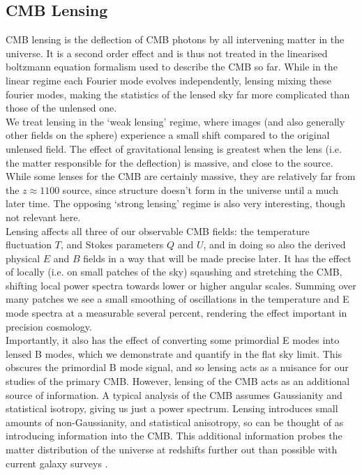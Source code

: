 \documentclass[a4paper,10pt]{article}
\begin{document}
\subsection{CMB Lensing}
CMB lensing is the deflection of CMB photons by all intervening matter in the universe. It is a second order effect and is thus not treated in the linearised boltzmann equation formalism used to describe the CMB so far. While in the linear regime each Fourier mode evolves independently, lensing mixing these fourier modes, making the statistics of the lensed sky far more complicated than those of the unlensed one. \\

We treat lensing in the `weak lensing' regime, where images (and also generally other fields on the sphere) experience a small shift compared to the original unlensed field. The effect of gravitational lensing is greatest when the lens (i.e. the matter responsible for the deflection) is massive, and close to the source. While some lenses for the CMB are certainly massive, they are relatively far from the $z\approx1100$ source, since structure doesn't form in the universe until a much later time. The opposing `strong lensing' regime is also very interesting, though not relevant here.\\

Lensing affects all three of our observable CMB fields: the temperature fluctuation $T$, and Stokes parameters $Q$ and $U$, and in doing so also the derived physical $E$ and $B$ fields in a way that will be made precise later. It has the effect of locally (i.e. on small patches of the sky) sqaushing and stretching the CMB, shifting local power spectra towards lower or higher angular scales. Summing over many patches we see a small smoothing of oscillations in the temperature and E mode spectra at a measurable several percent, rendering the effect important in precision cosmology. \\

Importantly, it also has the effect of converting some primordial E modes into lensed B modes, which we demonstrate and quantify in the flat sky limit. This obscures the primordial B mode signal, and so lensing acts as a nuisance for our studies of the primary CMB. However, lensing of the CMB acts as an additional source of information. A typical analysis of the CMB assumes Gaussianity and statistical isotropy, giving us just a power spectrum. Lensing introduces small amounts of non-Gaussianity, and statistical anisotropy, so can be thought of as introducing information into the CMB. This additional information probes the matter distribution of the universe at redshifts further out than possible with current galaxy surveys \cite{sloan}.
\end{document}
